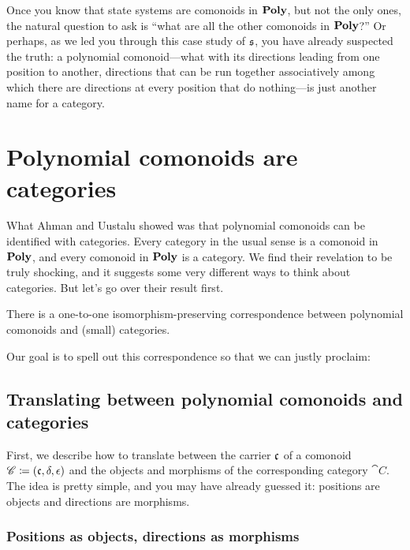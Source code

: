 \documentclass[Book-Poly]{subfiles}
\begin{document}
Once you know that state systems are comonoids in $\mathbf{Poly}$, but not the only ones, the natural question to ask is ``what are all the other comonoids in $\mathbf{Poly}$?''
Or perhaps, as we led you through this case study of $\mathfrak{s}$, you have already suspected the truth: a polynomial comonoid---what with its directions leading from one position to another, directions that can be run together associatively among which there are directions at every position that do nothing---is just another name for a category.

\section{Polynomial comonoids are categories}

What Ahman and Uustalu showed was that polynomial comonoids can be identified with categories.
Every category in the usual sense is a comonoid in $\mathbf{Poly}$, and every comonoid in $\mathbf{Poly}$ is a category.
We find their revelation to be truly shocking, and it suggests some very different ways to think about categories.
But let's go over their result first.

\begin{theorem}\label{thm.ahman_uustalu}
There is a one-to-one isomorphism-preserving correspondence between polynomial comonoids and (small) categories.
\end{theorem}

Our goal is to spell out this correspondence so that we can justly proclaim:


\subsection{Translating between polynomial comonoids and categories}

First, we describe how to translate between the carrier $\mathfrak{c}$ of a comonoid $\mathscr{C}\coloneqq(\mathfrak{c},\delta,\epsilon)$ and the objects and morphisms of the corresponding category $\cat{C}$.
The idea is pretty simple, and you may have already guessed it: positions are objects and directions are morphisms.

\subsubsection{Positions as objects, directions as morphisms}
\end{document}
